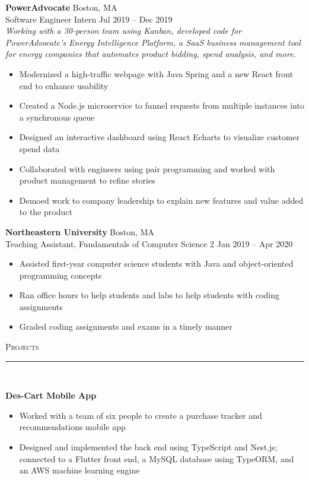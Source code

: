 \documentclass[11pt]{article}
\begin{document}
\begin{raggedright}
	\textbf{\large PowerAdvocate} \hfill Boston, MA \\
	Software Engineer Intern \hfill Jul 2019 -- Dec 2019 \\
	\textit{Working with a 30-person team using Kanban, developed code for PowerAdvocate's Energy Intelligence Platform, a SaaS business management tool for energy companies that automates product bidding, spend analysis, and more.}
	\begin{itemize}
		\item Modernized a high-traffic webpage with Java Spring and a new React front end to enhance usability
		\item Created a Node.js microservice to funnel requests from multiple instances into a synchronous queue
		\item Designed an interactive dashboard using React Echarts to visualize customer spend data
		\item Collaborated with engineers using pair programming and worked with product management to refine stories
		\item Demoed work to company leadership to explain new features and value added to the product
	\end{itemize}
	\vspace{0.1in}
	
	\textbf{\large Northeastern University} \hfill Boston, MA \\
	Teaching Assistant, Fundamentals of Computer Science 2 \hfill Jan 2019 -- Apr 2020 \\
	\begin{itemize}
		\item Assisted first-year computer science students with Java and object-oriented programming concepts
		\item Ran office hours to help students and labs to help students with coding assignments
		\item Graded coding assignments and exams in a timely manner
	\end{itemize}
	\vspace{0.15in}
	
	
	\textsc{\Large Projects} \\
	\vspace{-0.1in}
	\rule{\textwidth}{0.4pt} \\
	\vspace{0.05in}
	
	\textbf{\large Des-Cart Mobile App} 
	\begin{itemize}
		\item Worked with a team of six people to create a purchase tracker and recommendations mobile app
		\item Designed and implemented the back end using TypeScript and Nest.js; connected to a Flutter front end, a MySQL database using TypeORM, and an AWS machine learning engine
	\end{itemize}
	\vspace{0.1in}
	

\end{raggedright}
\end{document}
